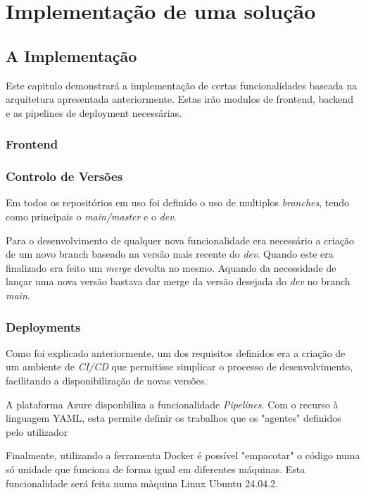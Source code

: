 \chapter{Implementação de uma solução}

\section{A Implementação}

Este capitulo demonstrará a implementação de certas funcionalidades baseada na arquitetura apresentada anteriormente. Estas irão modulos de frontend, backend e as pipelines de deployment necessárias. 



\subsection{Frontend}



\subsection{Controlo de Versões}

Em todos os repositórios em uso foi definido o uso de multiplos \textit{branches}, tendo como principais o \textit{main/master} e o \textit{dev}. 

Para o desenvolvimento de qualquer nova funcionalidade era necessário a criação de um novo branch baseado na versão mais recente do \textit{dev}. Quando este era finalizado era feito um \textit{merge} devolta no mesmo. Aquando da necessidade de lançar uma nova versão bastava dar merge da versão desejada do \textit{dev} no branch \textit{main}.

\subsection{Deployments}

Como foi explicado anteriormente, um dos requisitos definidos  era a criação de um ambiente de \textit{CI/CD} que permitisse simplicar o processo de desenvolvimento, facilitando a disponibilização de novas versões.

A plataforma Azure disponbiliza a funcionalidade \textit{Pipelines}. Com o recurso à linguagem YAML, esta permite definir os trabalhos que os "agentes" definidos pelo utilizador

Finalmente, utilizando a ferramenta Docker é possível "empacotar" o código numa só unidade que funciona de forma igual em diferentes máquinas. Esta funcionalidade será feita numa màquina Linux Ubuntu 24.04.2. 

